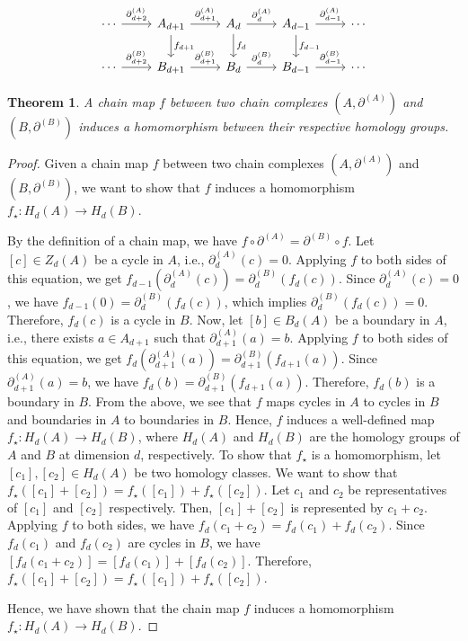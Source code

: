 \documentclass{amsart}
\newtheorem{theorem}{Theorem}
\begin{document}
\begin{equation}
\begin{tikzcd}
\cdots \arrow[r, "\partial^{(A)}_{d+2}"] & A_{d+1} \arrow[r, "\partial^{(A)}_{d+1}"] \arrow[d, "f_{d+1}"] & A_d \arrow[r, "\partial^{(A)}_{d}"] \arrow[d, "f_d"] & A_{d-1} \arrow[r, "\partial^{(A)}_{d-1}"] \arrow[d, "f_{d-1}"] & \cdots \\
\cdots \arrow[r, "\partial^{(B)}_{d+2}"] & B_{d+1} \arrow[r, "\partial^{(B)}_{d+1}"]                                  & B_d \arrow[r, "\partial^{(B)}_d"]                              & B_{d-1} \arrow[r, "\partial^{(B)}_{d-1}"]                                  & \cdots
\end{tikzcd}
\end{equation}

\begin{theorem}
\label{chainmaps}
A chain map $f$ between two chain complexes $(A, \partial^{(A)})$ and $(B,\partial^{(B)})$ induces a homomorphism between their respective homology groups.
\end{theorem}

\begin{proof}
Given a chain map $f$ between two chain complexes $(A, \partial^{(A)})$ and $(B,\partial^{(B)})$, we want to show that $f$ induces a homomorphism $f_\star: H_d(A) \rightarrow H_d(B)$.

By the definition of a chain map, we have $f \circ \partial^{(A)} = \partial^{(B)} \circ f$. Let $[c] \in Z_d(A)$ be a cycle in $A$, i.e., $\partial^{(A)}_d(c) = 0$. Applying $f$ to both sides of this equation, we get $f_{d-1}(\partial^{(A)}_d(c)) = \partial^{(B)}_d(f_d(c))$. Since $\partial^{(A)}_d(c) = 0$, we have $f_{d-1}(0) = \partial^{(B)}_d(f_d(c))$, which implies $\partial^{(B)}_d(f_d(c)) = 0$. Therefore, $f_d(c)$ is a cycle in $B$. Now, let $[b] \in B_d(A)$ be a boundary in $A$, i.e., there exists $a \in A_{d+1}$ such that $\partial^{(A)}_{d+1}(a) = b$. Applying $f$ to both sides of this equation, we get $f_d(\partial^{(A)}_{d+1}(a)) = \partial^{(B)}_{d+1}(f_{d+1}(a))$. Since $\partial^{(A)}_{d+1}(a) = b$, we have $f_d(b) = \partial^{(B)}_{d+1}(f_{d+1}(a))$. Therefore, $f_d(b)$ is a boundary in $B$. From the above, we see that $f$ maps cycles in $A$ to cycles in $B$ and boundaries in $A$ to boundaries in $B$. Hence, $f$ induces a well-defined map $f_\star: H_d(A) \rightarrow H_d(B)$, where $H_d(A)$ and $H_d(B)$ are the homology groups of $A$ and $B$ at dimension $d$, respectively. To show that $f_\star$ is a homomorphism, let $[c_1], [c_2] \in H_d(A)$ be two homology classes. We want to show that $f_\star([c_1] + [c_2]) = f_\star([c_1]) + f_\star([c_2])$. Let $c_1$ and $c_2$ be representatives of $[c_1]$ and $[c_2]$ respectively. Then, $[c_1] + [c_2]$ is represented by $c_1 + c_2$. Applying $f$ to both sides, we have $f_d(c_1 + c_2) = f_d(c_1) + f_d(c_2)$. Since $f_d(c_1)$ and $f_d(c_2)$ are cycles in $B$, we have $[f_d(c_1 + c_2)] = [f_d(c_1)] + [f_d(c_2)]$. Therefore, $f_\star([c_1] + [c_2]) = f_\star([c_1]) + f_\star([c_2])$.

Hence, we have shown that the chain map $f$ induces a homomorphism $f_\star: H_d(A) \rightarrow H_d(B)$.
\end{proof}
\end{document}
